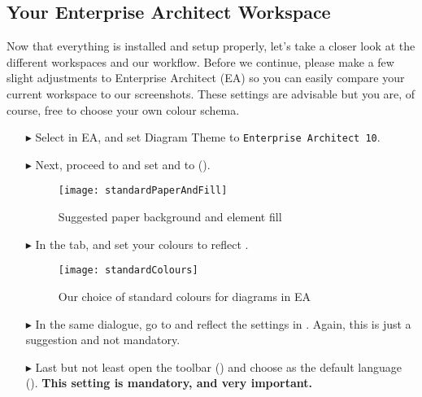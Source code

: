 \genHeader

\subsection{Your Enterprise Architect Workspace}

Now\hypertarget{projectStructure vis}{} that everything is installed and setup properly, let's take a closer look at the different workspaces and our workflow.
Before we continue, please make a few slight adjustments to Enterprise Architect (EA) so you can easily compare your current workspace to our screenshots.
These settings are advisable but you are, of course, free to choose your own colour schema.

\begin{itemize}

\item[$\blacktriangleright$] Select  in EA, and set Diagram Theme to \texttt{Enterprise Architect 10}.

\item[$\blacktriangleright$] Next, proceed to  and set  and  to  (). 

\begin{figure}[htbp]
    \centering
    \texttt{[image: standardPaperAndFill]}
    \caption{Suggested paper background and element fill}
    \label{ea:paperAndElementFill}
\end{figure}

\item[$\blacktriangleright$] In the  tab, and set your colours to reflect .

\begin{figure}[htbp]
  \centering
  \texttt{[image: standardColours]}
  \caption{Our choice of standard colours for diagrams in EA}
  \label{ea:standardColoursEA}
\end{figure}

\vspace{0.5cm}

\item[$\blacktriangleright$]
In the same dialogue, go to  and reflect the settings in .
Again, this is just a suggestion and not mandatory.

\item[$\blacktriangleright$]
Last but not least open the  toolbar () and choose  as the default language ().
\textbf{This setting is mandatory, and very important.}
\end{itemize}

